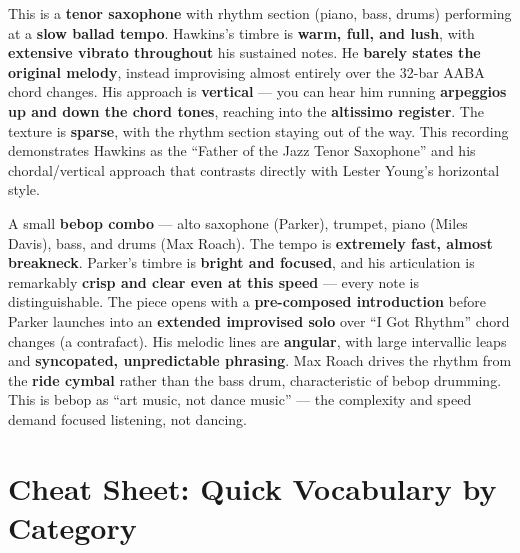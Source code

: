 \documentclass[11pt,letterpaper]{article}
\begin{document}
\begin{tcolorbox}[examplebox, title={Example: Coleman Hawkins --- ``Body and Soul'' (1939)}]
This is a \textbf{tenor saxophone} with rhythm section (piano, bass, drums) performing at a \textbf{slow ballad tempo}. Hawkins's timbre is \textbf{warm, full, and lush}, with \textbf{extensive vibrato throughout} his sustained notes. He \textbf{barely states the original melody}, instead improvising almost entirely over the 32-bar AABA chord changes. His approach is \textbf{vertical} --- you can hear him running \textbf{arpeggios up and down the chord tones}, reaching into the \textbf{altissimo register}. The texture is \textbf{sparse}, with the rhythm section staying out of the way. This recording demonstrates Hawkins as the ``Father of the Jazz Tenor Saxophone'' and his chordal/vertical approach that contrasts directly with Lester Young's horizontal style.
\end{tcolorbox}

\begin{tcolorbox}[examplebox, title={Example: Charlie Parker --- ``Ko Ko'' (1945)}]
A small \textbf{bebop combo} --- alto saxophone (Parker), trumpet, piano (Miles Davis), bass, and drums (Max Roach). The tempo is \textbf{extremely fast, almost breakneck}. Parker's timbre is \textbf{bright and focused}, and his articulation is remarkably \textbf{crisp and clear even at this speed} --- every note is distinguishable. The piece opens with a \textbf{pre-composed introduction} before Parker launches into an \textbf{extended improvised solo} over ``I Got Rhythm'' chord changes (a contrafact). His melodic lines are \textbf{angular}, with large intervallic leaps and \textbf{syncopated, unpredictable phrasing}. Max Roach drives the rhythm from the \textbf{ride cymbal} rather than the bass drum, characteristic of bebop drumming. This is bebop as ``art music, not dance music'' --- the complexity and speed demand focused listening, not dancing.
\end{tcolorbox}

\section{Cheat Sheet: Quick Vocabulary by Category}
\end{document}
